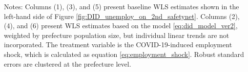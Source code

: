 \begin{table}
\begin{threeparttable}
\begin{tablenotes}
\small
\item [] Notes: Columns (1), (3), and (5) present baseline WLS estimates shown in  the left-hand side of Figure \ref{fig:DID_unemploy_on_2nd_safetynet}. Columns (2), (4), and (6) present WLS estimates based on the model \eqref{eq:did_model_ver2}, weighted by prefecture population size, but individual linear trends are not incorporated. The treatment variable is the COVID-19-induced employment shock, which is calculated as equation \eqref{eq:employment_shock}. Robust standard errors are clustered at the prefecture level.
\end{tablenotes}
\end{threeparttable}
\end{table}
